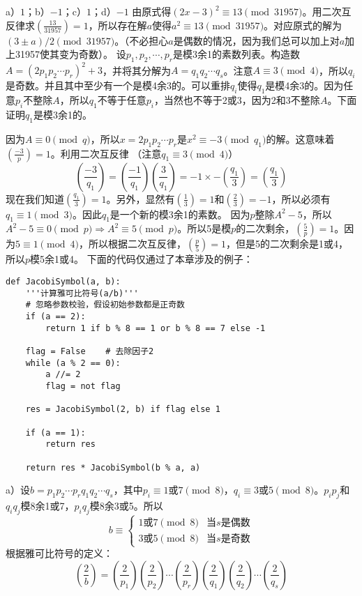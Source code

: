 %
\exercise a）$1$；b）$-1$；c）$1$；d）$-1$
%
\exercise 由原式得$(2x-3)^2\equiv13\pmod{31957}$。用二次互反律求$(\frac{13}{31957})=1$，所以存在解$a$使得$a^2\equiv13\pmod{31957}$。对应原式的解为$(3\pm a)/2\pmod{31957}$。（不必担心$a$是偶数的情况，因为我们总可以加上对$a$加上31957使其变为奇数）。
%
\exercise \proof 设$p_1,p_2,\cdots,p_r$是模3余1的素数列表。构造数$A=(2p_1p_2\cdots p_r)^2+3$，并将其分解为$A=q_1q_2\cdots q_s$。注意$A\equiv3\pmod4$，所以$q_i$是奇数。并且其中至少有一个是模4余3的。可以重排$q_i$使得$q_1$是模4余3的。因为任意$p_i$不整除$A$，所以$q_1$不等于任意$p_i$，当然也不等于2或3，因为2和3不整除$A$。下面证明$q_1$是模3余1的。\par
因为$A\equiv 0\pmod q$，所以$x=2p_1p_2\cdots p_r$是$x^2\equiv-3\pmod{q_1}$的解。这意味着$(\frac{-3}{p})=1$。利用二次互反律 （注意$q_1\equiv3\pmod4$）
\[\left(\frac{-3}{q_1}\right)=\left(\frac{-1}{q_1}\right)\left(\frac{3}{q_1}\right)=-1\times-\left(\frac{q_1}{3}\right)=\left(\frac{q_1}{3}\right)\]
现在我们知道$(\frac{q_1}{3})=1$。另外，显然有$(\frac{1}{3})=1$和$(\frac{2}{3})=-1$，所以必须有$q_1\equiv1\pmod3$。因此$q_1$是一个新的模3余1的素数。
%
\exercise \proof 因为$p$整除$A^2-5$，所以$A^2-5\equiv0\pmod p\Rightarrow A^2\equiv5\pmod p$。所以5是模$p$的二次剩余，$\left(\frac{5}{p}\right)=1$。因为$5\equiv1\pmod4$，所以根据二次互反律，$\left(\frac{p}{5}\right)=1$，但是5的二次剩余是1或4，所以$p$模5余1或4。
%
\exercise 下面的代码仅通过了本章涉及的例子：
\begin{lstlisting}
def JacobiSymbol(a, b):
    '''计算雅可比符号(a/b)'''
    # 忽略参数校验，假设初始参数都是正奇数
    if (a == 2):
        return 1 if b % 8 == 1 or b % 8 == 7 else -1

    flag = False    # 去除因子2
    while (a % 2 == 0):
        a //= 2
        flag = not flag

    res = JacobiSymbol(2, b) if flag else 1

    if (a == 1):
        return res

    return res * JacobiSymbol(b % a, a)
\end{lstlisting}
%
\exercise a）设$b=p_1p_2\cdots p_rq_1q_2\cdots q_s$，其中$p_i\equiv1\text{或}7\pmod8$，$q_i\equiv3\text{或}5\pmod8$。$p_ip_j$和$q_iq_j$模8余1或7，$p_iq_j$模8余3或5。所以
\[b\equiv
\begin{cases}
1 \text{或}7\pmod8 & \text{当$s$是偶数}\\
3 \text{或}5\pmod8 & \text{当$s$是奇数}
\end{cases}\]
根据雅可比符号的定义：
\[\left(\frac{2}{b}\right)=\left(\frac{2}{p_1}\right)\left(\frac{2}{p_2}\right)\cdots\left(\frac{2}{p_r}\right)\left(\frac{2}{q_1}\right)\left(\frac{2}{q_2}\right)\cdots\left(\frac{2}{q_s}\right)\]
